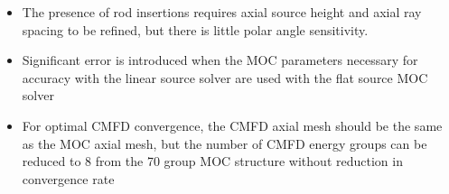 \vfill
\begin{highlightsbox}[frametitle=Highlights]
\begin{itemize}
  \item The presence of rod insertions requires axial source height and axial ray spacing to be refined, but there is little polar angle sensitivity.
  \item Significant error is introduced when the \ac{MOC} parameters necessary for accuracy with the linear source solver are used with the flat source \ac{MOC} solver
  \item For optimal \ac{CMFD} convergence, the \ac{CMFD} axial mesh should be the same as the \ac{MOC} axial mesh, but the number of \ac{CMFD} energy groups can be reduced to 8 from the 70 group \ac{MOC} structure without reduction in convergence rate
  \end{itemize}
\end{highlightsbox}
\vfill